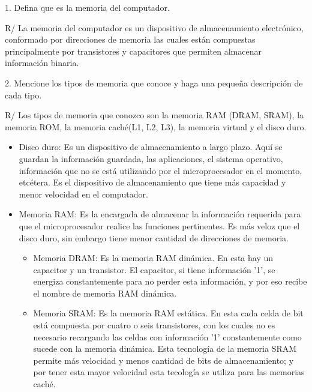 \documentclass{article}
\begin{document}
1. Defina que es la memoria del computador.

R/ La memoria del computador es un dispositivo de almacenamiento electrónico, conformado por direcciones de memoria las cuales están compuestas principalmente por transistores y capacitores que permiten almacenar información binaria.

\vspace{0.5cm}
2. Mencione los tipos de memoria que conoce y haga una pequeña descripción de cada tipo.

R/ Los tipos de memoria que conozco son la memoria RAM (DRAM, SRAM), la memoria ROM, la memoria caché(L1, L2, L3), la memoria virtual y el disco duro.


\begin{itemize}


    \item Disco duro:
    Es un dispositivo de almacenamiento a largo plazo. Aquí se guardan la información guardada, las aplicaciones, el sistema operativo, información que no se está utilizando por el microprocesador en el momento, etcétera. Es el dispositivo de almacenamiento que tiene más capacidad y menor velocidad en el computador.
    
    
    \item Memoria RAM:
    Es la encargada de almacenar la información requerida para que el microprocesador realice las funciones pertinentes. Es más veloz que el disco duro, sin embargo tiene menor cantidad de direcciones de memoria.
    \begin{itemize}
        \item Memoria DRAM:
        Es la memoria RAM dinámica. En esta hay un capacitor y un transistor. El capacitor, si tiene información '1', se energiza constantemente para no perder esta información, y por eso recibe el nombre de memoria RAM dinámica.
        \item Memoria SRAM:
        Es la memoria RAM estática. En esta cada celda de bit está compuesta por cuatro o seis transistores, con los cuales no es necesario recargando las celdas con información '1' constantemente como sucede con la memoria dinámica. Esta tecnología de la memoria SRAM permite más velocidad y menos cantidad de bits de almacenamiento; y por tener esta mayor velocidad esta tecología se utiliza para las memorias caché.
    \end{itemize}



\end{itemize}
\end{document}
